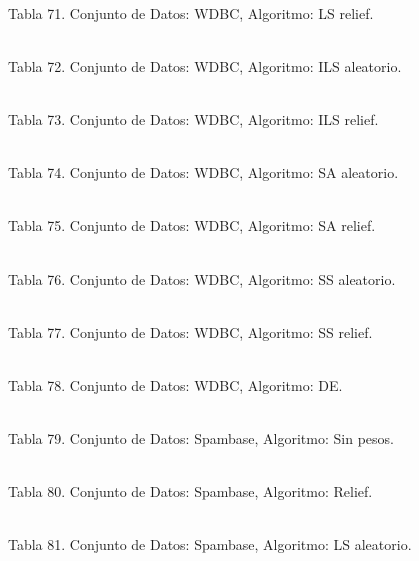\documentclass{ci5652}
\begin{document}
%
\\
Tabla 71. Conjunto de Datos: WDBC, Algoritmo: LS relief.

%
\\
Tabla 72. Conjunto de Datos: WDBC, Algoritmo: ILS aleatorio.

%
\\
Tabla 73. Conjunto de Datos: WDBC, Algoritmo: ILS relief.

%
\\
Tabla 74. Conjunto de Datos: WDBC, Algoritmo: SA aleatorio.

%
\\
Tabla 75. Conjunto de Datos: WDBC, Algoritmo: SA relief.

%
\\
Tabla 76. Conjunto de Datos: WDBC, Algoritmo: SS aleatorio.

%
\\
Tabla 77. Conjunto de Datos: WDBC, Algoritmo: SS relief.

%
\\
Tabla 78. Conjunto de Datos: WDBC, Algoritmo: DE.

%
\\
Tabla 79. Conjunto de Datos: Spambase, Algoritmo: Sin pesos.

%
\\
Tabla 80. Conjunto de Datos: Spambase, Algoritmo: Relief.

%
\\
Tabla 81. Conjunto de Datos: Spambase, Algoritmo: LS aleatorio.
\end{document}

